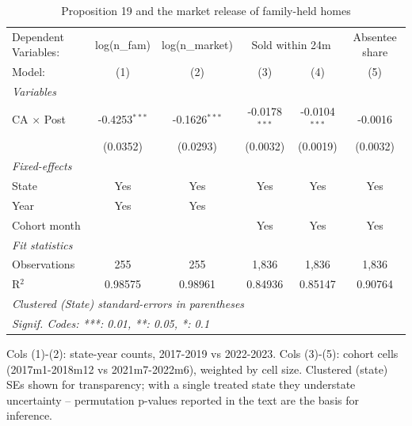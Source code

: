 
\begin{table}[htbp]
   \caption{\label{tab:prop19} Proposition 19 and the market release of family-held homes}
   \centering
   \begin{tabular}{lccccc}
      \tabularnewline \midrule \midrule
      Dependent Variables: & log(n\_fam) & log(n\_market) & \multicolumn{2}{c}{Sold within 24m} & Absentee share\\
      Model:            & (1)             & (2)             & (3)             & (4)             & (5)\\  
      \midrule
      \emph{Variables}\\
      CA $\times$ Post  & -0.4253$^{***}$ & -0.1626$^{***}$ & -0.0178$^{***}$ & -0.0104$^{***}$ & -0.0016\\   
                        & (0.0352)        & (0.0293)        & (0.0032)        & (0.0019)        & (0.0032)\\   
      \midrule
      \emph{Fixed-effects}\\
      State             & Yes             & Yes             & Yes             & Yes             & Yes\\  
      Year              & Yes             & Yes             &                 &                 & \\  
      Cohort month      &                 &                 & Yes             & Yes             & Yes\\  
      \midrule
      \emph{Fit statistics}\\
      Observations      & 255             & 255             & 1,836           & 1,836           & 1,836\\  
      R$^2$             & 0.98575         & 0.98961         & 0.84936         & 0.85147         & 0.90764\\  
      \midrule \midrule
      \multicolumn{6}{l}{\emph{Clustered (State) standard-errors in parentheses}}\\
      \multicolumn{6}{l}{\emph{Signif. Codes: ***: 0.01, **: 0.05, *: 0.1}}\\
   \end{tabular}
   
   \par \raggedright 
   Cols (1)-(2): state-year counts, 2017-2019 vs 2022-2023. Cols (3)-(5): cohort cells (2017m1-2018m12 vs 2021m7-2022m6), weighted by cell size. Clustered (state) SEs shown for transparency; with a single treated state they understate uncertainty -- permutation p-values reported in the text are the basis for inference.
\end{table}


